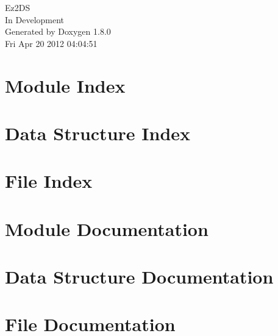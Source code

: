 \documentclass{book}
\begin{document}
\hypersetup{pageanchor=false,citecolor=blue}
\begin{titlepage}
\vspace*{7cm}
\begin{center}
{\Large Ez2\-D\-S \\[1ex]\large In Development }\\
\vspace*{1cm}
{\large Generated by Doxygen 1.8.0}\\
\vspace*{0.5cm}
{\small Fri Apr 20 2012 04:04:51}\\
\end{center}
\end{titlepage}
\clearemptydoublepage
{}
\tableofcontents
\clearemptydoublepage
{}
\hypersetup{pageanchor=true,citecolor=blue}
\chapter{Module Index}

\chapter{Data Structure Index}

\chapter{File Index}

\chapter{Module Documentation}


\chapter{Data Structure Documentation}












\chapter{File Documentation}


\printindex
\end{document}
